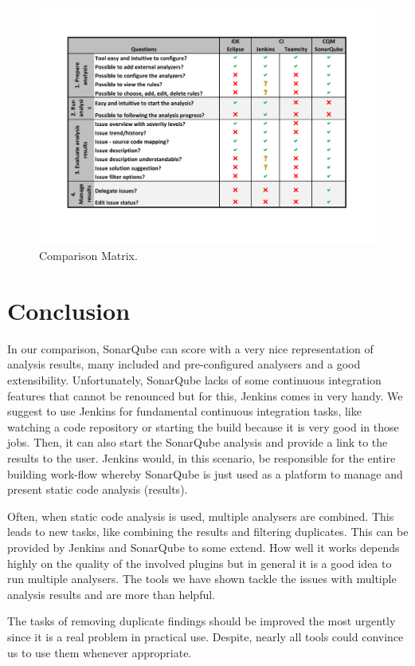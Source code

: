 \documentclass[conference]{IEEEtran}
\begin{document}
\begin{figure}[t]
	\includegraphics[width=\textwidth]{img/comparation}
	\caption{Comparison Matrix.}
	\label{fig:comparison_matrix}
\end{figure}

\section{Conclusion}
\label{sec:conclusion}
In our comparison, SonarQube can score with a very nice representation of analysis results, many included and pre-configured analysers and a good extensibility. Unfortunately, SonarQube lacks of some continuous integration features that cannot be renounced but for this, Jenkins comes in very handy. We suggest to use Jenkins for fundamental continuous integration tasks, like watching a code repository or starting the build because it is very good in those jobs. Then, it can also start the SonarQube analysis and provide a link to the results to the user. Jenkins would, in this scenario, be responsible for the entire building work-flow whereby SonarQube is just used as a platform to manage and present static code analysis (results).

Often, when static code analysis is used, multiple analysers are combined. This leads to new tasks, like combining the results and filtering duplicates. This can be provided by Jenkins and SonarQube to some extend. How well it works depends highly on the quality of the involved plugins but in general it is a good idea to run multiple analysers. The tools we have shown tackle the issues with multiple analysis results and are more than helpful.

The tasks of removing duplicate findings should be improved the most  urgently since it is a real problem in practical use. Despite, nearly all tools could convince us to use them whenever appropriate.




\end{document}
